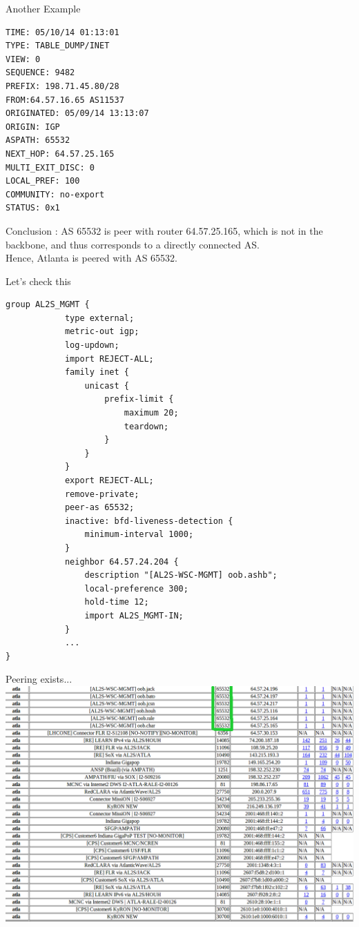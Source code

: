 \documentclass[usenames,dvipsnames]{beamer}
\begin{document}
\begin{frame}[fragile]{Another Example}
\begin{lstlisting}
TIME: 05/10/14 01:13:01
TYPE: TABLE_DUMP/INET
VIEW: 0
SEQUENCE: 9482
PREFIX: 198.71.45.80/28
FROM:64.57.16.65 AS11537
ORIGINATED: 05/09/14 13:13:07
ORIGIN: IGP
ASPATH: 65532
NEXT_HOP: 64.57.25.165
MULTI_EXIT_DISC: 0
LOCAL_PREF: 100
COMMUNITY: no-export
STATUS: 0x1
\end{lstlisting}
Conclusion : AS 65532 is peer with router 64.57.25.165, which is not in the backbone, and thus corresponds to a directly connected AS.\\ Hence, Atlanta is peered with AS 65532.
\end{frame}

\begin{frame}[fragile]{Let's check this}
\begin{lstlisting}
group AL2S_MGMT {
            type external;
            metric-out igp;
            log-updown;
            import REJECT-ALL;
            family inet {
                unicast {
                    prefix-limit {
                        maximum 20;
                        teardown;
                    }
                }
            }
            export REJECT-ALL;
            remove-private;
            peer-as 65532;
            inactive: bfd-liveness-detection {
                minimum-interval 1000;
            }
            neighbor 64.57.24.204 {
                description "[AL2S-WSC-MGMT] oob.ashb";
                local-preference 300;
                hold-time 12;
                import AL2S_MGMT-IN;
            }
            ...
}
\end{lstlisting}

\end{frame}

\begin{frame}{Peering exists...}
\includegraphics[width=\textwidth]{atla_65532.png}
\end{frame}
\end{document}
